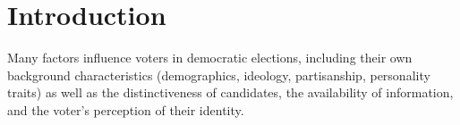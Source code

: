 \section{Introduction}
\label{sec:intro}

Many factors influence voters in democratic elections, including their own
background characteristics (demographics, ideology, partisanship, personality
traits) as well as the distinctiveness of candidates, the availability of
information, and the voter's perception of their
identity.\cite[pp.3-4]{redlawsk_citizens_2020}


